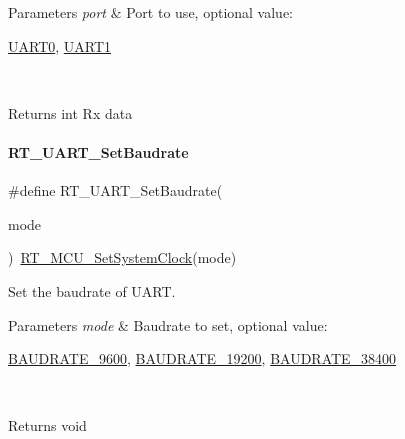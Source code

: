 \begin{DoxyParams}{Parameters}
{\em port} & Port to use, optional value\+:
\begin{DoxyCode}
\mbox{\hyperlink{a00173_a0508661f121639ffdee7de2353a0def2}{UART0}}, \mbox{\hyperlink{a00173_a8d69bf04d07af4fbbab5a8bd291f65ff}{UART1}}
\end{DoxyCode}
 \\
\hline
\end{DoxyParams}
\begin{DoxyReturn}{Returns}
int Rx data 
\end{DoxyReturn}
\mbox{\label{a00173_a565befb27caf782083358e0ad81af3a3}} 
\paragraph{\texorpdfstring{R\+T\+\_\+\+U\+A\+R\+T\+\_\+\+Set\+Baudrate}{RT\_UART\_SetBaudrate}}
{\footnotesize\ttfamily \#define R\+T\+\_\+\+U\+A\+R\+T\+\_\+\+Set\+Baudrate(\begin{DoxyParamCaption}\item[{}]{mode }\end{DoxyParamCaption})~\mbox{\hyperlink{a00068_a017f8665ec51267680fc0e536db19c13}{R\+T\+\_\+\+M\+C\+U\+\_\+\+Set\+System\+Clock}}(mode)}



Set the baudrate of U\+A\+RT. 


\begin{DoxyParams}{Parameters}
{\em mode} & Baudrate to set, optional value\+:
\begin{DoxyCode}
\mbox{\hyperlink{a00173_a89d72bee69b33d0404d33f47608d16f0}{BAUDRATE\_9600}}, \mbox{\hyperlink{a00173_ab94a89ecf1976f304764aec119e215e7}{BAUDRATE\_19200}}, \mbox{\hyperlink{a00173_a9c74d2185a532185624b8dc3086f8e3e}{BAUDRATE\_38400}}
\end{DoxyCode}
 \\
\hline
\end{DoxyParams}
\begin{DoxyReturn}{Returns}
void 
\end{DoxyReturn}
\mbox{\label{a00173_a432520c6f67a10918aa07884250a7cbc}} 
